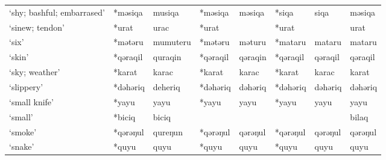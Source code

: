 \begin{landscape}
\begin{longtable}[c]{@{}p{3cm}<{\raggedright}p{2.75cm}<{\raggedright}p{2.75cm}<{\raggedright}p{2.75cm}<{\raggedright}p{2.75cm}<{\raggedright}p{2.75cm}<{\raggedright}p{2.75cm}<{\raggedright}p{2.75cm}<{\raggedright}@{}}
`shy; bashful; embarrased'                           & *məsiqa      & musiqa                        & *məsiqa        & məsiqa                     & *siqa            & siqa                     & məsiqa                            \\
`sinew; tendon'                                      & *urat        & urac                          & *urat          &                            & *urat            &                          & urat                              \\
`six'                                                & *mətəru      & mumuteru                      & *mətəru        & məturu                     & *mataru          & mataru                   & mataru                            \\
`skin'                                               & *qəraqil     & quraqin                       & *qəraqil       & qəraqin                    & *qəraqil         & qəraqil                  & qəraqil                           \\
`sky; weather'                                       & *karat       & karac                         & *karat         & karac                      & *karat           & karac                    & karat                             \\
`slippery'                                           & *dəhəriq     & deheriq                       & *dəhəriq       & dəhəriq                    & *dəhəriq         & dəhəriq                  & dəhəriq                           \\
`small knife'                                        & *yayu        & yayu                          & *yayu          & yayu                       & *yayu            & yayu                     & yayu                              \\
`small'                                              & *biciq       & biciq                         &                &                            &                  &                          & bilaq                             \\
`smoke'                                              & *qərəŋul     & qureŋun                       & *qərəŋul       & qərəŋul                    & *qərəŋul         & qərəŋul                  & qərəŋul                           \\
`snake'                                              & *quyu        & quyu                          & *quyu          & quyu                       & *quyu            & quyu                     & quyu                              \\

\end{longtable}
\end{landscape}

